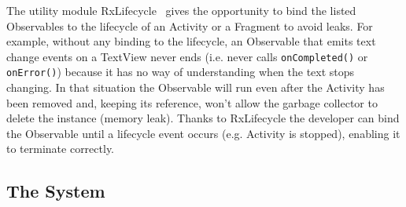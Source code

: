 \documentclass[11pt,a4paper,notitlepage]{article}
\begin{document}
The utility module RxLifecycle~\cite{RxLifecycle} gives the opportunity to bind the listed Observables to the lifecycle of an Activity or a Fragment to avoid leaks. For example, without any binding to the lifecycle, an Observable that emits text change events on a TextView never ends (i.e. never calls \texttt{onCompleted()} or \texttt{onError()}) because it has no way of understanding when the text stops changing. In that situation the Observable will run even after the Activity has been removed and, keeping its reference, won't allow the garbage collector to delete the instance (memory leak). Thanks to RxLifecycle the developer can bind the Observable until a lifecycle event occurs (e.g. Activity is stopped), enabling it to terminate correctly.

\subsection{The System}
\end{document}
